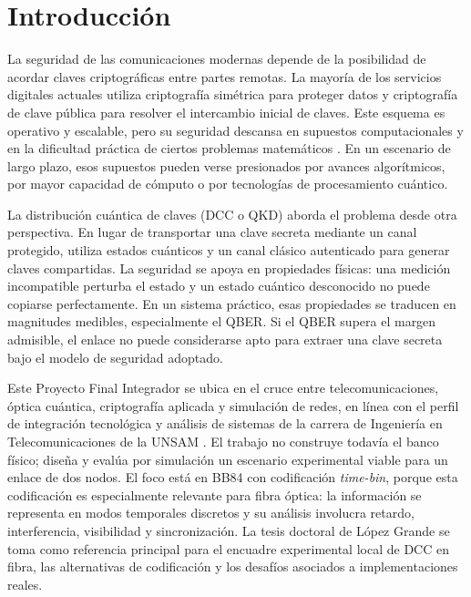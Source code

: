 \chapter{Introducción}
\label{chap:introduccion}

La seguridad de las comunicaciones modernas depende de la posibilidad de acordar claves criptográficas entre partes remotas. La mayoría de los servicios digitales actuales utiliza criptografía simétrica para proteger datos y criptografía de clave pública para resolver el intercambio inicial de claves. Este esquema es operativo y escalable, pero su seguridad descansa en supuestos computacionales y en la dificultad práctica de ciertos problemas matemáticos \cite{rivest1978rsa}. En un escenario de largo plazo, esos supuestos pueden verse presionados por avances algorítmicos, por mayor capacidad de cómputo o por tecnologías de procesamiento cuántico.

La distribución cuántica de claves (DCC o QKD) aborda el problema desde otra perspectiva. En lugar de transportar una clave secreta mediante un canal protegido, utiliza estados cuánticos y un canal clásico autenticado para generar claves compartidas. La seguridad se apoya en propiedades físicas: una medición incompatible perturba el estado y un estado cuántico desconocido no puede copiarse perfectamente. En un sistema práctico, esas propiedades se traducen en magnitudes medibles, especialmente el QBER. Si el QBER supera el margen admisible, el enlace no puede considerarse apto para extraer una clave secreta bajo el modelo de seguridad adoptado.

Este Proyecto Final Integrador se ubica en el cruce entre telecomunicaciones, óptica cuántica, criptografía aplicada y simulación de redes, en línea con el perfil de integración tecnológica y análisis de sistemas de la carrera de Ingeniería en Telecomunicaciones de la UNSAM \cite{unsamTelecom}. El trabajo no construye todavía el banco físico; diseña y evalúa por simulación un escenario experimental viable para un enlace de dos nodos. El foco está en BB84 con codificación \textit{time-bin}, porque esta codificación es especialmente relevante para fibra óptica: la información se representa en modos temporales discretos y su análisis involucra retardo, interferencia, visibilidad y sincronización. La tesis doctoral de López Grande \cite{lopezGrande2018} se toma como referencia principal para el encuadre experimental local de DCC en fibra, las alternativas de codificación y los desafíos asociados a implementaciones reales.

